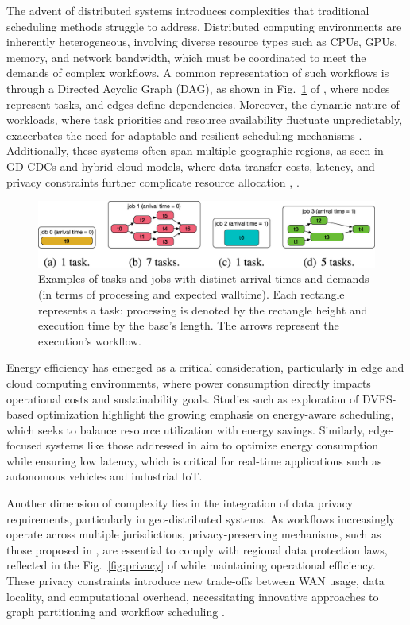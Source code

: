 \documentclass[a4paper, final]{article}
\begin{document}
The advent of distributed systems introduces complexities that traditional scheduling methods struggle to address. 
Distributed computing environments are inherently heterogeneous, involving diverse resource types such as CPUs, GPUs, 
memory, and network bandwidth, which must be coordinated to meet the demands of complex workflows. A 
common representation of such workflows is through a Directed Acyclic Graph (DAG), as shown in Fig.~\ref{fig:1} of  \cite{bib:1_acrl}, 
where nodes represent tasks, and edges define dependencies. Moreover, the dynamic nature of workloads, where task 
priorities and resource availability fluctuate unpredictably, exacerbates the need 
for adaptable and resilient scheduling mechanisms \cite{bib:3_sandcat}. Additionally, these systems often span 
multiple geographic regions, as seen in GD-CDCs and hybrid cloud models, where data transfer costs, latency, and 
privacy constraints further complicate resource allocation \cite{bib:7_ppps}, \cite{bib:9}.

\begin{figure}[H]
   \centering
   \includegraphics[scale=1.5]{dag.jpg}
   \caption{Examples of tasks and jobs with distinct arrival times and demands (in terms of processing and expected 
   walltime). Each rectangle represents a task: processing is denoted by the rectangle height and execution time by 
   the base’s length. The arrows represent the execution’s workflow.}
   \label{fig:1}
\end{figure}

Energy efficiency has emerged as a critical consideration, particularly in edge and cloud computing environments, 
where power consumption directly impacts operational costs and sustainability goals. Studies such as
exploration of DVFS-based optimization \cite{bib:5_epee} highlight the growing emphasis on energy-aware scheduling, 
which seeks to balance resource utilization with energy savings. Similarly, edge-focused systems like those addressed 
in \cite{bib:3_sandcat} aim to optimize energy consumption while ensuring low latency, which is 
critical for real-time applications such as autonomous vehicles and industrial IoT.

Another dimension of complexity lies in the integration of data privacy requirements, particularly in geo-distributed 
systems. As workflows increasingly operate across multiple jurisdictions, privacy-preserving mechanisms, such as those 
proposed in \cite{bib:7_ppps}, are essential to comply with regional data protection laws, reflected in the Fig.~\ref{fig:privacy}
of \cite{bib:7_ppps} while maintaining operational efficiency. These privacy constraints introduce new trade-offs between WAN usage, data 
locality, and computational overhead, necessitating innovative approaches to graph partitioning and workflow 
scheduling \cite{bib:8}.
\end{document}
